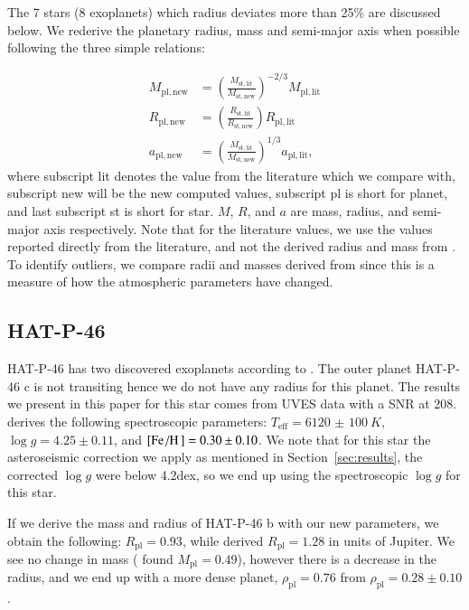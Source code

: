 \documentclass{aa}
\begin{document}
The 7 stars (8 exoplanets) which radius deviates more than 25\% are discussed
below. We rederive the planetary radius, mass and semi-major axis when possible
following the three simple relations:

\begin{align}
    M_\mathrm{pl,new} &= \left(\frac{M_\mathrm{st,lit}}{M_\mathrm{st,new}}\right)^{-2/3} M_\mathrm{pl,lit}  \\
    R_\mathrm{pl,new} &= \left(\frac{R_\mathrm{st,lit}}{R_\mathrm{st,new}}\right) R_\mathrm{pl,lit} \\
    a_\mathrm{pl,new} &= \left(\frac{M_\mathrm{st,lit}}{M_\mathrm{st,new}}\right)^{1/3} a_\mathrm{pl,lit},
\end{align}
where subscript lit denotes the value from the literature which we compare with,
subscript new will be the new computed values, subscript pl is short for planet,
and last subscript st is short for star. $M$, $R$, and $a$ are mass, radius, and
semi-major axis respectively. Note that for the literature values, we use the
values reported directly from the literature, and not the derived radius and
mass from \citet{Torres2010}. To identify outliers, we compare radii and masses
derived from \citet{Torres2010} since this is a measure of how the atmospheric
parameters have changed.

\subsection{HAT-P-46}
\label{sub:HAT-P-46}
HAT-P-46 has two discovered exoplanets according to \citet{Hartmann2014}. The
outer planet HAT-P-46 c is not transiting hence we do not have any radius for
this planet. The results we present in this paper for this star comes from UVES
data with a SNR at 208. \citet{Hartmann2014} derives the following spectroscopic
parameters: $T_\mathrm{eff}=\SI{6120(100)}{K}$, $\log g=4.25\pm0.11$, and
$[\ion{Fe}/\ion{H}]=0.30\pm0.10$. We note that for this star the asteroseismic
correction we apply as mentioned in Section~\ref{sec:results}, the corrected
$\log g$ were below 4.2dex, so we end up using the spectroscopic $\log g$ for
this star.

If we derive the mass and radius of HAT-P-46 b with our new parameters, we
obtain the following: $R_\mathrm{pl} = 0.93$, while \citet{Hartmann2014} derived
$R_\mathrm{pl} = 1.28$ in units of Jupiter. We see no change in mass
(\citet{Hartmann2014} found $M_\mathrm{pl}=0.49$), however there is a decrease
in the radius, and we end up with a more dense planet, $\rho_\mathrm{pl}=0.76$
from $\rho_\mathrm{pl}=0.28\pm0.10$.
\end{document}

